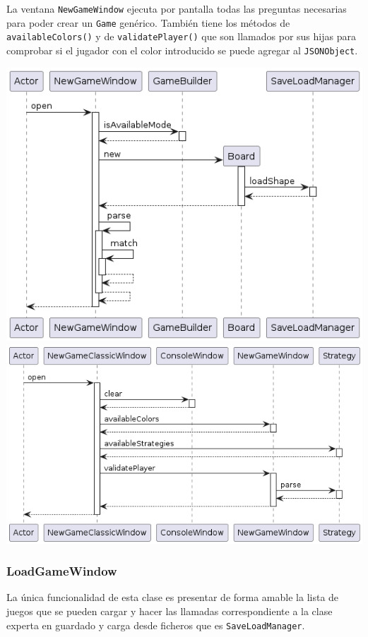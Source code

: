 \documentclass[../DocumentoOficial.tex]{subfiles}
\begin{document}
La ventana \texttt{NewGameWindow} ejecuta por pantalla todas las preguntas necesarias para poder crear un \texttt{Game} genérico. También tiene los métodos de \texttt{availableColors()} y de \texttt{validatePlayer()} que son llamados por sus hijas para comprobar si el jugador con el color introducido se puede agregar al \texttt{JSONObject}.

\begin{center}
\includegraphics[scale=0.5]{NewGameWindow_final_seq}
\includegraphics[scale=0.5]{NewGameClassicWindow_final_seq}
\end{center}

\subsubsection{LoadGameWindow}
La única funcionalidad de esta clase es presentar de forma amable la lista de juegos que se pueden cargar y hacer las llamadas correspondiente a la clase experta en guardado y carga desde ficheros que es \texttt{SaveLoadManager}.
\end{document}
